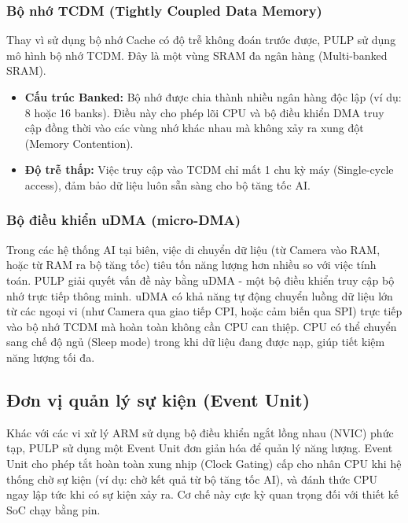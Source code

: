 \subsubsection{Bộ nhớ TCDM (Tightly Coupled Data Memory)}
Thay vì sử dụng bộ nhớ Cache có độ trễ không đoán trước được, 
PULP sử dụng mô hình bộ nhớ TCDM. Đây là một vùng SRAM đa ngân hàng (Multi-banked SRAM).
\begin{itemize}
    \item \textbf{Cấu trúc Banked:} Bộ nhớ được chia thành nhiều ngân hàng độc lập (ví dụ: 8 hoặc 16 banks). Điều này cho phép lõi CPU và bộ điều khiển DMA truy cập đồng thời vào các vùng nhớ khác nhau mà không xảy ra xung đột (Memory Contention).
    \item \textbf{Độ trễ thấp:} Việc truy cập vào TCDM chỉ mất 1 chu kỳ máy (Single-cycle access), đảm bảo dữ liệu luôn sẵn sàng cho bộ tăng tốc AI.
\end{itemize}

\subsubsection{Bộ điều khiển uDMA (micro-DMA)}
Trong các hệ thống AI tại biên, việc di chuyển dữ liệu (từ Camera vào RAM, hoặc từ RAM ra bộ tăng tốc) tiêu tốn năng lượng hơn nhiều so với việc tính toán.
PULP giải quyết vấn đề này bằng uDMA - một bộ điều khiển truy cập bộ nhớ trực tiếp thông minh. uDMA có khả năng tự động chuyển luồng dữ liệu lớn từ các ngoại vi (như Camera qua giao tiếp CPI, hoặc cảm biến qua SPI) trực tiếp vào bộ nhớ TCDM mà hoàn toàn không cần CPU can thiệp. CPU có thể chuyển sang chế độ ngủ (Sleep mode) trong khi dữ liệu đang được nạp, giúp tiết kiệm năng lượng tối đa.

\subsection{Đơn vị quản lý sự kiện (Event Unit)}
Khác với các vi xử lý ARM sử dụng bộ điều khiển ngắt lồng nhau (NVIC) phức tạp, PULP sử dụng một Event Unit đơn giản hóa để quản lý năng lượng. Event Unit cho phép tắt hoàn toàn xung nhịp (Clock Gating) cấp cho nhân CPU khi hệ thống chờ sự kiện (ví dụ: chờ kết quả từ bộ tăng tốc AI), và đánh thức CPU ngay lập tức khi có sự kiện xảy ra. Cơ chế này cực kỳ quan trọng đối với thiết kế SoC chạy bằng pin.

\newpage
